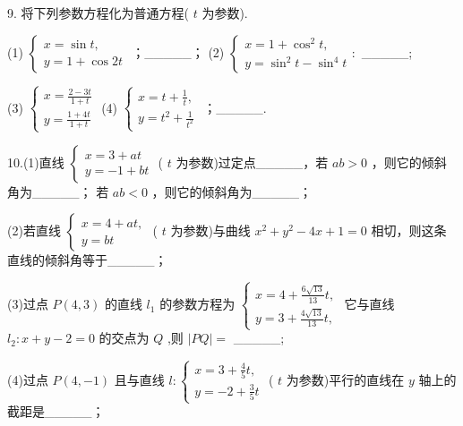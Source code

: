 \documentclass[10pt]{article}
\begin{document}
9. 将下列参数方程化为普通方程( \(t\) 为参数).

(1) \(\left\{  \begin{array}{l} x = \sin t, \\  y = 1 + \cos {2t} \end{array}\right.\) ；\_\_\_\_\_； (2) \(\left\{  {\begin{array}{l} x = 1 + {\cos }^{2}t, \\  y = {\sin }^{2}t - {\sin }^{4}t \end{array} : }\right.\) \_\_\_\_\_;

(3) \(\left\{  \begin{array}{l} x = \frac{2 - {3t}}{1 + t} \\  y = \frac{1 + {4t}}{1 + t} \end{array}\right.\) (4) \(\left\{  \begin{array}{l} x = t + \frac{1}{t}, \\  y = {t}^{2} + \frac{1}{{t}^{2}} \end{array}\right.\) ；\_\_\_\_\_.

10.(1)直线 \(\left\{  \begin{array}{l} x = 3 + {at} \\  y =  - 1 + {bt} \end{array}\right.\) ( \(t\) 为参数)过定点\_\_\_\_\_，若 \({ab} > 0\) ，则它的倾斜角为\_\_\_\_\_； 若 \({ab} < 0\) ，则它的倾斜角为\_\_\_\_\_；

(2)若直线 \(\left\{  \begin{array}{l} x = 4 + {at}, \\  y = {bt} \end{array}\right.\) ( \(t\) 为参数)与曲线 \({x}^{2} + {y}^{2} - {4x} + 1 = 0\) 相切，则这条直线的倾斜角等于\_\_\_\_\_；

(3)过点 \(P\left( {4,3}\right)\) 的直线 \({l}_{1}\) 的参数方程为 \(\left\{  \begin{array}{l} x = 4 + \frac{6\sqrt{13}}{13}t, \\  y = 3 + \frac{4\sqrt{13}}{13}t, \end{array}\right.\) 它与直线 \({l}_{2} : x + y - 2 = 0\) 的交点为 \(Q\) ,则 \(\left| {PQ}\right|  =\) \_\_\_\_\_;

(4)过点 \(P\left( {4, - 1}\right)\) 且与直线 \(l : \left\{  \begin{array}{l} x = 3 + \frac{4}{5}t, \\  y =  - 2 + \frac{3}{5}t \end{array}\right.\) ( \(t\) 为参数)平行的直线在 \(y\) 轴上的截距是\_\_\_\_\_；
\end{document}
